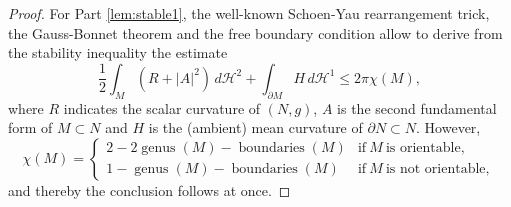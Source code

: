\documentclass[10pt]{amsart}
\newcounter{cas}
\DeclareMathOperator{\boundaries}{boundaries}
\DeclareMathOperator{\genus}{genus}
\theoremstyle{definition}
\newcommand{\h}{\mathscr{H}}
\begin{document}
\begin{proof}
For Part \eqref{lem:stable1}, the well-known Schoen-Yau rearrangement trick, the Gauss-Bonnet theorem and the free boundary condition allow to derive from the stability inequality the estimate
\begin{equation}\label{eq:STAB}
\frac{1}{2}\int_{M}(R+|A|^2)\,d\h^2+\int_{\partial M}H\,d\h^1\leq 2\pi\chi(M),
\end{equation}
where $R$ indicates the scalar curvature of $(N,g)$, $A$ is the second fundamental form of $M\subset N$ and $H$ is the (ambient) mean curvature of $\partial N\subset N$. However,
\begin{equation}\label{eq:chiFBMS}
\chi(M)=
\begin{cases}
2-2\genus(M)-\boundaries(M) & \text{if} \ M \ \text{is orientable}, \\
1-\genus(M)-\boundaries(M) & \text{if} \ M \ \text{is not orientable},
\end{cases}
\end{equation}
and thereby the conclusion follows at once.


\end{proof}
\end{document}
